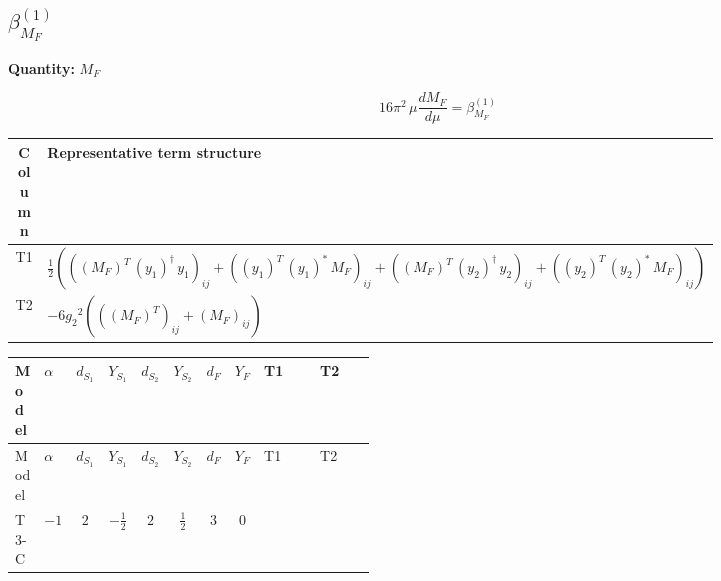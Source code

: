 \documentclass[8pt]{article}
\begin{document}
\begin{landscape}
\section*{$\beta_{M_F}^{(1)}$}
\noindent\textbf{Quantity: }$M_F$\par\smallskip
\[16\pi^2\,\mu\frac{d M_F}{d\mu}=\beta_{M_F}^{(1)}\]
\begin{center}
\begin{tabular}{@{}c >{\raggedright\arraybackslash}p{0.82\linewidth}@{}}
\toprule
Column & Representative term structure \\
\midrule
T1 & \(\displaystyle \frac{1}{2} (\left(\left({M_F}\right)^{T}\,\left({y_1}\right)^{\dagger}\,{y_1}\right)_{ij}+\left(\left({y_1}\right)^{T}\,\left({y_1}\right)^{*}\,{M_F}\right)_{ij}+\left(\left({M_F}\right)^{T}\,\left({y_2}\right)^{\dagger}\,{y_2}\right)_{ij}+\left(\left({y_2}\right)^{T}\,\left({y_2}\right)^{*}\,{M_F}\right)_{ij})\) \\
\midrule
T2 & \(\displaystyle -6 {g_2}^2 (\left(\left({M_F}\right)^{T}\right)_{ij}+\left({M_F}\right)_{ij})\) \\
\midrule
\bottomrule
\end{tabular}
\end{center}
\smallskip
\tiny
\begin{longtable}{@{}llcccccc >{\raggedright\arraybackslash}p{0.21\linewidth} >{\raggedright\arraybackslash}p{0.21\linewidth}@{}}
\toprule
Model & $\alpha$ & $d_{S_1}$ & $Y_{S_1}$ & $d_{S_2}$ & $Y_{S_2}$ & $d_F$ & $Y_F$ & T1 & T2 \\
\midrule
\endfirsthead
\toprule
Model & $\alpha$ & $d_{S_1}$ & $Y_{S_1}$ & $d_{S_2}$ & $Y_{S_2}$ & $d_F$ & $Y_F$ & T1 & T2 \\
\midrule
\endhead
T3-C & $-1$ & $2$ & $-\frac{1}{2}$ & $2$ & $\frac{1}{2}$ & $3$ & $0$ & \scriptsize\adjustbox{max width=\linewidth}{$\begin{gathered} \frac{1}{2} (\left(\left({M_F}\right)^{T}\,\left({y_1}\right)^{\dagger}\,{y_1}\right)_{ij}+\left(\left({y_1}\right)^{T}\,\left({y_1}\right)^{*}\,{M_F}\right)_{ij}+\left(\left({M_F}\right)^{T}\,\left({y_2}\right)^{\dagger}\,{y_2}\right)_{ij}+\left(\left({y_2}\right)^{T}\,\left({y_2}\right)^{*}\,{M_F}\right)_{ij})\end{gathered}$} & \scriptsize\adjustbox{max width=\linewidth}{$\begin{gathered} -6 {g_2}^2 (\left(\left({M_F}\right)^{T}\right)_{ij}+\left({M_F}\right)_{ij})\end{gathered}$} \\
\midrule
\bottomrule
\end{longtable}
\clearpage

\end{landscape}
\end{document}
